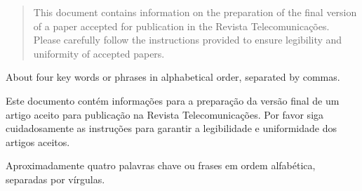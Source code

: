 \begin{abstract}
   This document contains information on the preparation of the final version of a paper accepted for publication in the Revista Telecomunicações. Please carefully follow the instructions provided to ensure legibility and uniformity of accepted papers.
\end{abstract}

\begin{keywords}
About four key words or phrases in alphabetical order, separated by commas. 
\end{keywords}

\begin{resumo}
   Este documento contém informações para a preparação da versão final de um artigo aceito para publicação na Revista Telecomunicações. Por favor siga cuidadosamente as instruções para garantir a legibilidade e uniformidade dos artigos aceitos.
\end{resumo}

\begin{palavrasChaves}
Aproximadamente quatro palavras chave ou frases em ordem alfabética, separadas por vírgulas.
\end{palavrasChaves}

